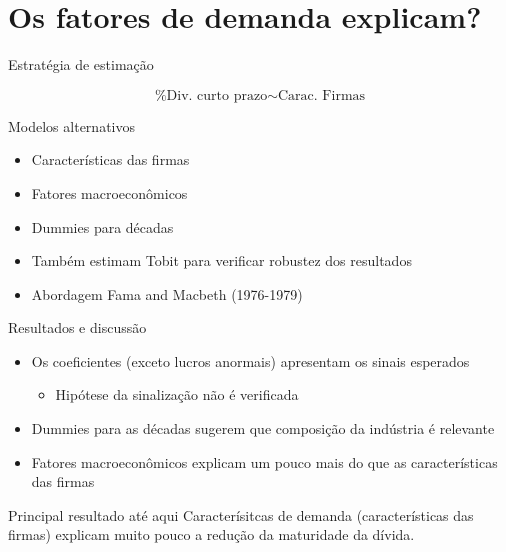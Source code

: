 \documentclass[presentation]{beamer}
\begin{document}
\section{Os fatores de demanda explicam?}
\label{sec:orgb991752}

\begin{frame}[label={sec:org4238d8b}]{Estratégia de estimação}
\begin{latex}
\begin{equation}
\text{\% Div. curto prazo} \sim \text{Carac. Firmas}
\end{equation}
\end{latex}

\begin{block}{Modelos alternativos}
\begin{itemize}
\item Características das firmas
\item Fatores macroeconômicos
\item Dummies para décadas
\item Também estimam Tobit para verificar robustez dos resultados
\item Abordagem Fama and Macbeth (1976-1979)
\end{itemize}
\end{block}
\end{frame}

\begin{frame}[label={sec:orgcb9f5aa}]{Resultados e discussão}
\begin{itemize}
\item Os coeficientes (exceto lucros anormais) apresentam os sinais esperados
\begin{itemize}
\item Hipótese da sinalização não é verificada
\end{itemize}
\item Dummies para as décadas sugerem que composição da indústria é relevante
\item Fatores macroeconômicos explicam um pouco mais do que as características das firmas
\end{itemize}


\begin{block}{Principal resultado até aqui}
Caracterísitcas de demanda (características das firmas) explicam muito pouco a redução da maturidade da dívida.
\end{block}
\end{frame}
\end{document}
